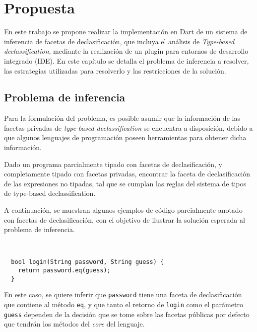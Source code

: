 \chapter{Propuesta}

En este trabajo se propone realizar la implementación en Dart de un sistema de inferencia de facetas de declasificación, que incluya el análisis de \textit{Type-based declassification}, mediante la realización de un plugin para entornos de desarrollo integrado (IDE). En este capítulo se detalla el problema de inferencia a resolver, las estrategias utilizadas para resolverlo y las restricciones de la solución.

\section{Problema de inferencia}
Para la formulación del problema, es posible asumir que la información de las facetas privadas de \textit{type-based declassification} se encuentra a disposición, debido a que algunos lenguajes de programación poseen herramientas para obtener dicha información.

\begin{defn}
  Dado un programa parcialmente tipado con facetas de declasificación, y completamente tipado con facetas privadas, encontrar la faceta de declasificación de las expresiones no tipadas, tal que se cumplan las reglas del sistema de tipos de type-based declassification.
\end{defn}

A continuación, se muestran algunos ejemplos de código parcialmente anotado con facetas de declasificación, con el objetivo de ilustrar la solución esperada al problema de inferencia.

\begin{ej} \ \\
  \label{ej1}
  \normalfont
\begin{lstlisting}
  bool login(String password, String guess) {
    return password.eq(guess);
  }
\end{lstlisting}
\end{ej}

En este caso, se quiere inferir que \texttt{password} tiene una faceta de declasificación que contiene al método \texttt{eq}, y que tanto el retorno de \texttt{login} como el parámetro \texttt{guess} dependen de la decisión que se tome sobre las facetas públicas por defecto que tendrán los métodos del \textit{core} del lenguaje.

